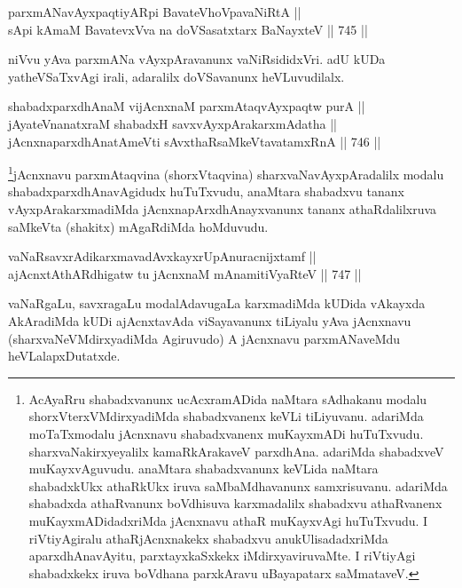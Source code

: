 \begin{shl}
parxmANavAyxpaqtiyAR\s pi BavateVhoVpavaNiRtA || \\
sA\s pi kAmaM BavatevxVva na doVSasatxtarx BaNayxteV \hfill || 745 || 
\end{shl}

\begin{artha} 
niVvu yAva parxmANa vAyxpAravanunx vaNiRsididxVri. adU kUDa yatheVSaTxvAgi irali, adaralilx doVSavanunx heVLuvudilalx.
\end{artha}

\begin{shl}
shabadxparxdhAnaM vijAcnxnaM parxmAtaqvAyxpaqtw purA || \\
jAyateV\s nanatxraM shabadxH savxvAyxpArakarxmAdatha || \\
jAcnxnaparxdhAnatAmeVti sAvxthaRsaMkeVtavatamxRnA \hfill || 746 ||  
\end{shl}

\begin{artha} 
\footnote{AcAyaRru shabadxvanunx ucAcxramADida naMtara sAdhakanu 
modalu shorxVterxVMdirxyadiMda shabadxvanenx keVLi tiLiyuvanu. 
adariMda moTaTxmodalu jAcnxnavu shabadxvanenx muKayxmADi huTuTxvudu. 
sharxvaNakirxyeyalilx kamaRkArakaveV parxdhAna. adariMda shabadxveV 
muKayxvAguvudu. anaMtara shabadxvanunx keVLida naMtara shabadxkUkx 
athaRkUkx iruva saMbaMdhavanunx samxrisuvanu. adariMda shabadxda 
athaRvanunx boVdhisuva karxmadalilx shabadxvu athaRvanenx 
muKayxmADidadxriMda jAcnxnavu athaR muKayxvAgi huTuTxvudu. I 
riVtiyAgiralu athaRjAcnxnakekx shabadxvu anukUlisadadxriMda 
aparxdhAnavAyitu, parxtayxkaSxkekx iMdirxyaviruvaMte. I riVtiyAgi 
shabadxkekx iruva boVdhana parxkAravu uBayapatarx 
saMmataveV.}jAcnxnavu parxmAtaqvina (shorxVtaqvina) 
sharxvaNavAyxpAradalilx modalu shabadxparxdhAnavAgidudx huTuTxvudu, 
anaMtara shabadxvu tananx vAyxpArakarxma\-diMda jAcnxnapArxdhAnayxvanunx 
tananx athaRdalilxruva saMkeVta (shakitx) mAgaRdiMda hoMduvudu.
\end{artha}


\begin{shl}
vaNaRsavxrAdikarxmavadAvxkayxrUpAnuracnijxtamf || \\
ajAcnxtAthARdhigatw tu jAcnxnaM mAnamitiVyaRteV \hfill || 747 ||  
\end{shl}

\begin{artha} 
vaNaRgaLu, savxragaLu modalAdavugaLa karxmadiMda kUDida vAkayxda 
AkAradiMda kUDi ajAcnxtavAda viSayavanunx tiLiyalu yAva jAcnxnavu 
(sharxvaNeVMdirxyadiMda Agiruvudo) A jAcnxnavu parxmANaveMdu 
heVLalapxDutatxde.
\end{artha}

